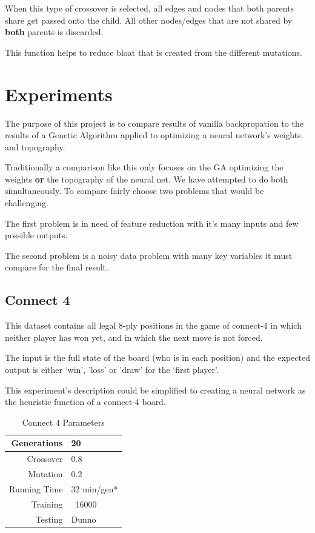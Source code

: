 \documentclass[journal]{IEEEtran}
\begin{document}
    When this type of crossover is selected, all edges and nodes that both parents share get
    passed onto the child. All other nodes/edges that are not shared by \textbf{both} parents
    is discarded. 
    
    This function helps to reduce bloat that is created from the different mutations.
    
\section{Experiments}
  The purpose of this project is to compare results of vanilla backpropation to the results of
  a Genetic Algorithm applied to optimizing a neural network's weights and topography. 
  
  Traditionally a comparison like this only focuses on the GA optimizing the weights \textbf{or}
  the topography of the neural net. We have attempted to do both simultaneously. To compare fairly
  choose two problems that would be challenging.
  
  The first problem is in need of feature reduction with it's many inputs and few possible outputs.
  
  The second problem is a noisy data problem with many key variables it must compare for the final
  result.

  \subsection{Connect 4}
   This dataset contains all legal 8-ply positions in the game of
   connect-4 in which neither player has won yet, and in which the next
   move is not forced.    
   
   The input is the full state of the board (who is in each position) and the expected output
   is either `win', 'loss' or 'draw' for the `first player'.
   
   This experiment's description could be simplified to creating a neural network as the heuristic
   function of a connect-4 board.
   
   \begin{table}[here]
    \renewcommand{\arraystretch}{1.3}
    \caption{Connect 4 Parameters}
    \label{E1}
    \centering
    \begin{tabular}{r||l}
      \hline
      Generations & 20  \\ \hline
      Crossover   & 0.8 \\ \hline
      Mutation    & 0.2 \\ \hline
      Running Time & 32 min/gen* \\ \hline
      Training    & ~16000 \\ \hline
      Testing     & Dunno \\ \hline
    \end{tabular}
   \end{table}
    
\end{document}
